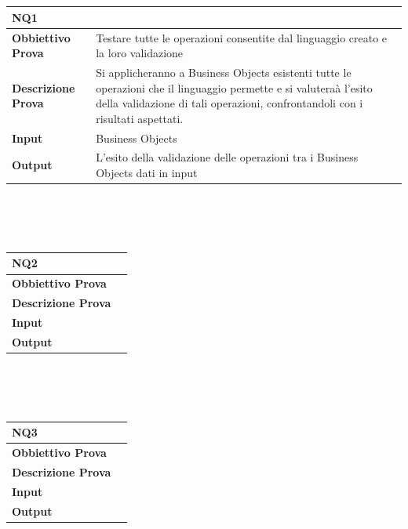 \documentclass[11pt,titlepage,a4paper]{report}
\begin{document}
\\
\\
\begin{tabular}{||p{4.5cm}||p{7.5cm}||}
\hline
\textbf{\textsf{NQ1}} \\
\hline
{\textbf{Obbiettivo Prova}}& Testare tutte le operazioni consentite dal linguaggio creato e la loro validazione\\ \hline
{\textbf{Descrizione Prova}}& Si applicheranno a Business Objects esistenti tutte le operazioni che il linguaggio permette e si valutera\`a l'esito della validazione di tali operazioni, confrontandoli con i risultati aspettati.  \\ \hline
{\textbf{Input}}& Business Objects \\ \hline
{\textbf{Output}}& L'esito della validazione delle operazioni tra i Business Objects dati in input\\ \hline
\end{tabular} \\
\\
\\
\begin{tabular}{||p{4.5cm}||p{7.5cm}||}
\hline
\textbf{\textsf{NQ2}} \\
\hline
{\textbf {Obbiettivo Prova}}& \\ \hline
{\textbf{Descrizione Prova}}&  \\ \hline
{\textbf{Input}}&  \\ \hline
{\textbf{Output}}& \\ \hline
\end{tabular} \\
\\
\\
\begin{tabular}{||p{4.5cm}||p{7.5cm}||}
\hline
\textbf{\textsf{NQ3}} \\
\hline
{\textbf {Obbiettivo Prova}}& \\ \hline
{\textbf{Descrizione Prova}}&  \\ \hline
{\textbf{Input}}&  \\ \hline
{\textbf{Output}}& \\ \hline
\end{tabular} \\
\end{document}
